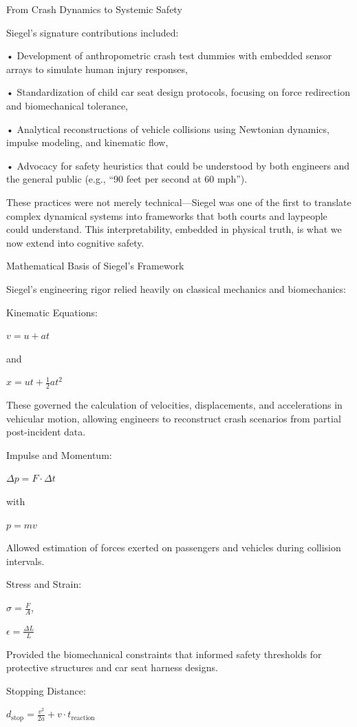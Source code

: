 \documentclass[11pt]{article}
\begin{document}
From Crash Dynamics to Systemic Safety

Siegel’s signature contributions included:

• Development of anthropometric crash test dummies with embedded sensor arrays to simulate human injury responses,

• Standardization of child car seat design protocols, focusing on force redirection and biomechanical tolerance,

• Analytical reconstructions of vehicle collisions using Newtonian dynamics, impulse modeling, and kinematic flow,

• Advocacy for safety heuristics that could be understood by both engineers and the general public (e.g., “90 feet per second at 60 mph”).

These practices were not merely technical—Siegel was one of the first to translate complex dynamical systems into frameworks that both courts and laypeople could understand. This interpretability, embedded in physical truth, is what we now extend into cognitive safety.

Mathematical Basis of Siegel’s Framework

Siegel’s engineering rigor relied heavily on classical mechanics and biomechanics:

Kinematic Equations:

$v = u + at$

and

$x = ut + \frac{1}{2}at^2$

These governed the calculation of velocities, displacements, and accelerations in vehicular motion, allowing engineers to reconstruct crash scenarios from partial post-incident data.

Impulse and Momentum:

$\Delta p = F \cdot \Delta t$

with

$p = mv$

Allowed estimation of forces exerted on passengers and vehicles during collision intervals.

Stress and Strain:

$\sigma = \frac{F}{A}$,

$\epsilon = \frac{\Delta L}{L}$

Provided the biomechanical constraints that informed safety thresholds for protective structures and car seat harness designs.

Stopping Distance:

$d_{\text{stop}} = \frac{v^2}{2a} + v \cdot t_{\text{reaction}}$
\end{document}
